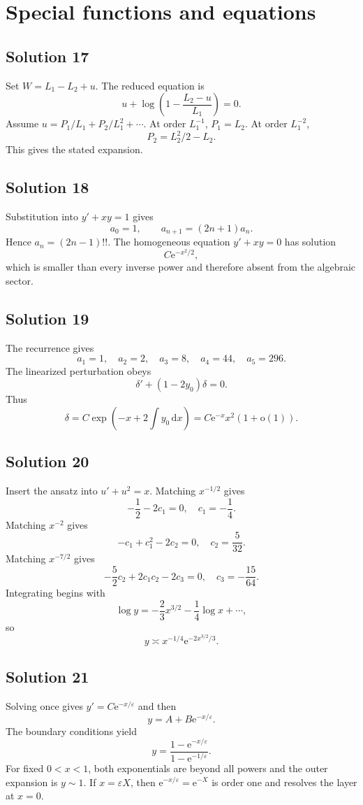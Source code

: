 \documentclass[11pt,openany]{book}
\theoremstyle{plain}
\theoremstyle{definition}
\theoremstyle{remark}
\newcommand{\smallo}{\mathrm{o}}
\newcommand{\dd}{\,\mathrm{d}}
\newcommand{\e}{\mathrm{e}}
\begin{document}
\section{Special functions and equations}

\subsection*{Solution 17}
Set $W=L_1-L_2+u$. The reduced equation is
\[
 u+\log\left(1-\frac{L_2-u}{L_1}\right)=0.
\]
Assume $u=P_1/L_1+P_2/L_1^2+\cdots$. At order $L_1^{-1}$,
$P_1=L_2$. At order $L_1^{-2}$,
\[
 P_2=L_2^2/2-L_2.
\]
This gives the stated expansion.

\subsection*{Solution 18}
Substitution into $y'+xy=1$ gives
\[
 a_0=1,
 \qquad a_{n+1}=(2n+1)a_n.
\]
Hence $a_n=(2n-1)!!$. The homogeneous equation $y'+xy=0$ has solution
\[
  C\e^{-x^2/2},
\]
which is smaller than every inverse power and therefore absent from the algebraic sector.

\subsection*{Solution 19}
The recurrence gives
\[
 a_1=1,
 \quad a_2=2,
 \quad a_3=8,
 \quad a_4=44,
 \quad a_5=296.
\]
The linearized perturbation obeys
\[
 \delta'+(1-2y_0)\delta=0.
\]
Thus
\[
 \delta=C\exp\left(-x+2\int y_0\dd x\right)
 =C\e^{-x}x^2(1+\smallo(1)).
\]

\subsection*{Solution 20}
Insert the ansatz into $u'+u^2=x$. Matching $x^{-1/2}$ gives
\[
 -\frac12-2c_1=0,
 \quad c_1=-\frac14.
\]
Matching $x^{-2}$ gives
\[
 -c_1+c_1^2-2c_2=0,
 \quad c_2=\frac5{32}.
\]
Matching $x^{-7/2}$ gives
\[
 -\frac52c_2+2c_1c_2-2c_3=0,
 \quad c_3=-\frac{15}{64}.
\]
Integrating begins with
\[
 \log y=-\frac23x^{3/2}-\frac14\log x+\cdots,
\]
so
\[
 y\asymp x^{-1/4}\e^{-2x^{3/2}/3}.
\]

\subsection*{Solution 21}
Solving once gives $y'=C\e^{-x/\varepsilon}$ and then
\[
 y=A+B\e^{-x/\varepsilon}.
\]
The boundary conditions yield
\[
 y=\frac{1-\e^{-x/\varepsilon}}{1-\e^{-1/\varepsilon}}.
\]
For fixed $0<x<1$, both exponentials are beyond all powers and the outer expansion is $y\sim1$. If $x=\varepsilon X$, then $\e^{-x/\varepsilon}=\e^{-X}$ is order one and resolves the layer at $x=0$.
\end{document}
